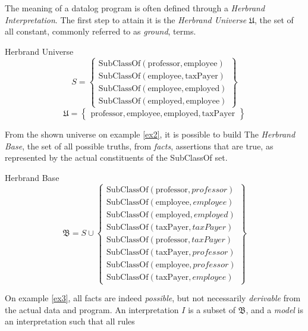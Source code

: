 The meaning of a datalog program is often\cite{datalog} defined through a \textit{Herbrand Interpretation}. The first step
to attain it is the \textit{Herbrand Universe} $\mathfrak{U}$, the set of all constant, commonly referred to as \textit{ground}, terms.
\begin{exmp}{Herbrand Universe}\label{ex2}
	\[
		S = \left\{ \begin{array}{l}
			\text{SubClassOf}(\text{professor}, \text{employee}) \\
			\text{SubClassOf}(\text{employee}, \text{taxPayer})  \\
			\text{SubClassOf}(\text{employee}, \text{employed})  \\
			\text{SubClassOf}(\text{employed}, \text{employee})
		\end{array}\right\}
	\]
	\[
		\mathfrak{U} = \left\{  \begin{array}{l}
			\text{professor}, \text{employee}, \text{employed}, \text{taxPayer}
		\end{array}\right\}
	\]
\end{exmp}
From the shown universe on example \ref{ex2}, it is possible to build The \textit{Herbrand Base}, the set of all possible truths,
from \textit{facts}, assertions that are true, as represented by the actual constituents of the SubClassOf set.
\begin{exmp}{Herbrand Base}\label{ex3}
	\[
		\mathfrak{B} = S \cup \left\{  \begin{array}{l}
			\text{SubClassOf}(\text{professor}, {professor}) \\
			\text{SubClassOf}(\text{employee}, {employee})   \\
			\text{SubClassOf}(\text{employed}, {employed})   \\
			\text{SubClassOf}(\text{taxPayer}, {taxPayer})   \\
			\text{SubClassOf}(\text{professor}, {taxPayer})  \\
			\text{SubClassOf}(\text{taxPayer}, {professor})  \\
			\text{SubClassOf}(\text{employee}, {professor})  \\
			\text{SubClassOf}(\text{taxPayer}, {employee})
		\end{array}\right\}
	\]
\end{exmp}
On example \ref{ex3}, all facts are indeed \textit{possible}, but not necessarily \textit{derivable} from the actual data and
program. An interpretation $I$ is a subset of $\mathfrak{B}$, and a \textit{model} is an interpretation such that all rules
